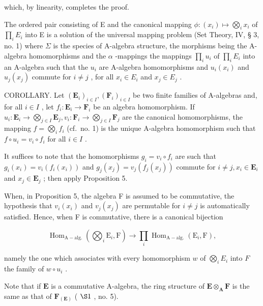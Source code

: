 which, by linearity, completes the proof.

The ordered pair consisting of E and the canonical mapping \(\phi: (x_i) \mapsto \bigotimes_i x_i\) of \(\prod_i E_i\) into E is a solution of the universal mapping problem (Set Theory, IV, § 3, no. 1) where \(\Sigma\) is the species of A-algebra structure, the morphisms being the A-algebra homomorphisms and the \(\alpha\) -mappings the mappings \(\prod_i u_i\) of \(\prod_i E_i\) into an A-algebra such that the \(u_i\) are A-algebra homomorphisms and \(u_i(x_i)\) and \(u_j(x_j)\) commute for \(i \neq j\) , for all \(x_i \in E_i\) and \(x_j \in E_j\) .

COROLLARY. Let \((\mathbf{E}_i)_{i\in I}, (\mathbf{F}_i)_{i\in I}\) be two finite families of A-algebras and, for all \(i\in I\) , let \(f_i: \mathbf{E}_i \to \mathbf{F}_i\) be an algebra homomorphism. If \(u_i: \mathbf{E}_i \to \bigotimes_{j\in I} \mathbf{E}_{j}, v_i: \mathbf{F}_i \to \bigotimes_{j\in I} \mathbf{F}_j\) are the canonical homomorphisms, the mapping \(f = \bigotimes_{i} f_i\) (cf.~no. 1) is the unique A-algebra homomorphism such that \(f \circ u_i = v_i \circ f_i\) for all \(i\in I\) .

It suffices to note that the homomorphisms \(g_{i} = v_{i} \circ f_{i}\) are such that \(g_{i}(x_{i}) = v_{i}(f_{i}(x_{i}))\) and \(g_{j}(x_{j}) = v_{j}(f_{j}(x_{j}))\) commute for \(i \neq j, x_{i} \in \mathbf{E}_{i}\) and \(x_{j} \in \mathbf{E}_{j}\) ; then apply Proposition 5.

When, in Proposition 5, the algebra F is assumed to be commutative, the hypothesis that \(v_{i}(x_{i})\) and \(v_{j}(x_{j})\) are permutable for \(i \neq j\) is automatically satisfied. Hence, when F is commutative, there is a canonical bijection

\[
\operatorname{Hom} _ {\mathrm{A-alg.}} \left(\bigotimes_ {i} \mathrm{E} _ {i}, \mathrm{F}\right)\rightarrow \prod_ {i} \operatorname{Hom} _ {\mathrm{A-alg.}} (\mathrm{E} _ {i}, \mathrm{F}),\tag{6}
\]

namely the one which associates with every homomorphism \(w\) of \(\bigotimes_{i} E_{i}\) into \(F\) the family of \(w \circ u_{i}\) .

Note that if \(\mathbf{E}\) is a commutative A-algebra, the ring structure of \(\mathbf{E} \otimes_{\mathbf{A}} \mathbf{F}\) is the same as that of \(\mathbf{F}_{(\mathbf{E})}\) ( \(\S 1\) , no. 5).

